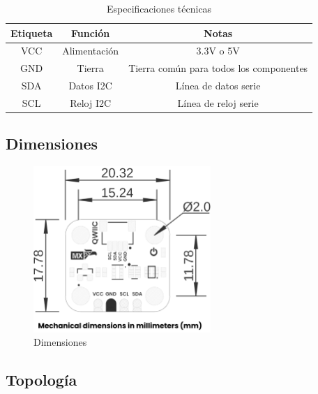 \documentclass[11pt,a4paper]{article}
\begin{document}
\begin{table}[H]
\centering
\small
\begin{tabular}{|c|c|c|}
\hline
Etiqueta & Función & Notas \\
\hline
VCC & Alimentación & 3.3V o 5V \\
GND & Tierra & Tierra común para todos los componentes \\
SDA & Datos I2C & Línea de datos serie \\
SCL & Reloj I2C & Línea de reloj serie \\
\hline
\end{tabular}
\caption{Especificaciones técnicas}
\end{table}


\subsection{Dimensiones}


\begin{figure}[H]
\centering
\includegraphics[width=0.6\textwidth]{es_unit_dimension_v_1_0_0_icp10111_barometric_pressure_sensor.png}
\caption{Dimensiones}
\label{fig:es-unit-dimension-v-1-0-0-icp10111-barometric-pressure-sensor-png}
\end{figure}



\subsection{Topología}
\end{document}
